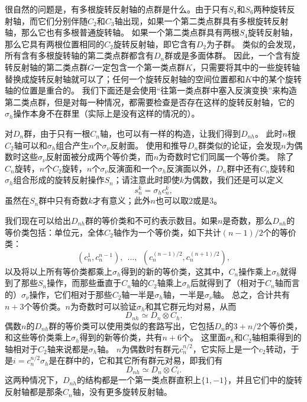 很自然的问题是，有多根旋转反射轴的点群是什么。由于只有$S_4$和$S_6$两种旋转反射轴，而它们分别伴随$C_2$和$C_3$轴出现，如果一个第二类点群具有多根旋转反射轴，那么它也有多根普通旋转轴。
如果一个第二类点群具有两根$S_4$旋转反射轴，那么它具有两根位置相同的$C_2$旋转反射轴，即它含有$D_2$为子群。
类似的会发现，所有含有多根旋转轴的第二类点群都含有$D_{n}$群或是多面体群。
因此，一个含有旋转反射轴的第二类点群$G$一定包含一个第一类点群$K$，只需要将其中的一些旋转轴替换成旋转反射轴就可以了；任何一个旋转反射轴的空间位置都和$K$中的某个旋转轴的位置是重合的。
我们下面还是会使用“往第一类点群中塞入反演变换”来构造第二类点群，但是对每一种情况，都需要检查是否存在这样的旋转反射轴，它的$\sigma_h$操作本身不在群里（实际上是没有这样的情况的）。

对$D_n$群，由于只有一根$C_n$轴，也可以有一样的构造，让我们得到$D_{nh}$。
此时$n$根$C_2$轴可以和$\sigma_h$组合产生$n$个$\sigma_\nu$反射面。
使用和推导$D_n$群类似的论证，会发现$n$为偶数时这些$\sigma_\nu$反射面被分成两个等价类，而$n$为奇数时它们同属一个等价类。
除了$C_n$旋转，$n$个$C_2$旋转，$n$个$\sigma_\nu$反演面和一个$\sigma_h$反演面以外，$D_n$群中还有$C_n$旋转和$\sigma_h$组合形成的旋转反射操作$S_n$；请注意此时即使$k$为偶数，我们还是可以定义
\begin{equation}
    s_n^k = \sigma_h c_n^k,
\end{equation}
虽然在$S_n$群中只有奇数$k$才有意义；此外$n$也可以取$2$或是$3$。

我们现在可以给出$D_{nh}$群的等价类和不可约表示数目。如果$n$是奇数，那么$D_{nh}$的等价类包括：单位元，全体$C_2$轴作为一个等价类，如下共计$(n-1)/2$个的等价类：
\[
    (c_n^1, c_n^{n-1}), \ \  \ldots, \ \  (c_n^{(n-1)/2}, c_n^{(n+1)/2}),
\]
以及将以上所有等价类都乘上$\sigma_h$得到的新的等价类，这其中，$C_n$操作乘上$\sigma_h$就得到了那些$S_n$操作，而那些垂直于$C_n$轴的$C_2$轴乘上$\sigma_h$后就得到了（相对于$C_n$轴而言的）$\sigma_\nu$操作，它们相对于那些$C_2$轴一半是$\sigma_h$轴，一半是$\sigma_\nu$轴。
总之，合计共有$n+3$个等价类。$n$为奇数时可以验证$\sigma_h$和其它群元均对易，从而
\begin{equation}
    D_{nh} \simeq D_n \otimes C_h.
\end{equation}
偶数$n$的$D_{nh}$群的等价类可以使用类似的套路写出，它包括$D_n$的$3 + n/2$个等价类，和这些等价类乘上$\sigma_h$得到的新等价类，共有$n+6$个。
这里面$\sigma_h$和$C_2$轴相乘得到的轴相对于$C_2$轴来说都是$\sigma_h$轴。%
$n$为偶数时有群元$c_n^{n/2}$，它实际上是一个$c_2$转动，于是$i = c_n^{n/2} \sigma_h$是在群中的，它和其它所有群元对易，即我们有
\begin{equation}
    D_{nh} \simeq D_n \otimes C_i.
\end{equation}
这两种情况下，$D_{nh}$的结构都是一个第一类点群直积上$\{1, -1\}$，并且它们中的旋转反射轴都是那条$C_n$轴，没有更多旋转反射轴。

